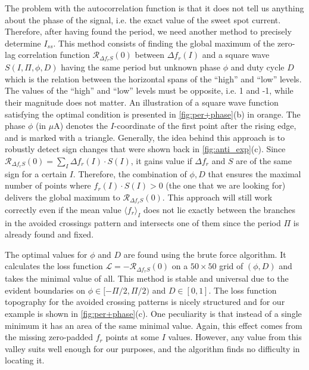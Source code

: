 \documentclass[%
 aip,
 amsmath,amssymb,
 reprint,%
]{revtex4-1}
\begin{document}
The problem with the autocorrelation function is that it does not tell us anything about the phase of the signal, i.e. the exact value of the sweet spot current. Therefore, after having found the period, we need another method to precisely determine $I_{ss}$. This method consists of finding the global maximum of the zero-lag correlation function $\mathcal{R}_{\Delta f_r S}(0)$ between $\Delta f_r(I)$ and a square wave $S(I, \Pi, \phi, D)$ having the same period but unknown phase $\phi$ and duty cycle $D$ which is the relation between the horizontal spans of the ``high'' and ``low'' levels. 
The values of the ``high'' and ``low'' levels must be opposite, i.e. 1 and -1, while their magnitude does not matter.  An illustration of a square wave function satisfying the optimal condition is presented in \autoref{fig:per+phase}(b) in orange. The phase $\phi$ (in $\mu$A) denotes the $I$-coordinate of the first point after the rising edge, and is marked with a triangle. Generally, the idea behind this approach is to robustly detect sign changes that were shown back in \autoref{fig:anti_exp}(c). Since $\mathcal{R}_{\Delta f_r S}(0) = \sum_I \Delta f_r(I) \cdot S(I) $, it gains value if $\Delta f_r$ and $S$ are of the same sign for a certain $I$. Therefore, the combination of $\phi, D$ that ensures the maximal number of points where $f_r(I)\cdot S(I)>0$ (the one that we are looking for) delivers the global maximum to $\mathcal{R}_{\Delta f_r S}(0)$. This approach will still work correctly even if the mean value $\langle f_r \rangle_{I}$ does not lie exactly between the branches in the avoided crossings pattern and intersects one of them since the period $\Pi$ is already found and fixed. 

The optimal values for $\phi$ and $D$ are found using the brute force algorithm. It calculates the loss function $\mathcal{L} = - \mathcal{R}_{\Delta f_r S}(0)$ on a $50 \times 50$ grid of $(\phi, D)$ and takes the minimal value of all. This method is stable and universal due to the evident boundaries on $\phi \in [-\Pi/2,\Pi/2)$ and $D \in [0, 1]$. The loss function topography for the avoided crossing patterns is nicely structured and for our example is shown in \autoref{fig:per+phase}(c). One peculiarity is that instead of a single minimum it has an area of the same minimal value. Again, this effect comes from the missing zero-padded $f_r$ points at some $I$ values. However, any value from this valley suits well enough for our purposes, and the algorithm finds no difficulty in locating it.
\end{document}
